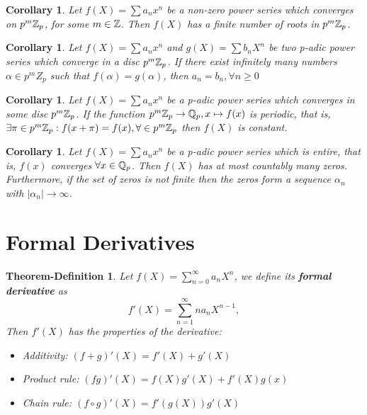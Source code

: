 \documentclass{article}
\theoremstyle{plain}
\newtheorem{Cor}[thm]{Corollary}
\newtheorem{thm-defi}[thm]{Theorem-Definition}
\theoremstyle{definition}
\begin{document}
	\begin{minipage}[t]{0.48\textwidth}
		\begin{Cor}
		Let $f(X) = \sum a_{n}x^{n}$ be a non-zero power series which converges on $p^{m}\Bbb Z_{p}$, for some $m \in \Bbb Z$. Then $f(X)$ has a finite number of roots in $p^{m} \Bbb Z_{p}$.
		\end{Cor}
		\begin{Cor}
		Let $f(X) = \sum a_{n}x^{n}$ and $g(X) = \sum b_{n}X^{n}$ be two p-adic power series which converge in a disc $p^{m}\Bbb Z_{p}$. If there exist infinitely many numbers $\alpha \in p^{m}Z_{p}$ such that $f(\alpha) = g(\alpha)$, then $a_{n} = b_{n}, \forall n \geq 0$
		\end{Cor}
		\begin{Cor}
		Let $f(X) = \sum a_{n}x^{n}$ be a p-adic power series which converges in some disc $p^{m}\Bbb Z_{p}$. If the function $p^{m}\Bbb Z_{p} \to \Bbb Q_{p}, x \mapsto f(x)$ is periodic, that is, $\exists \pi \in p^{m}\Bbb Z_{p} : f(x + \pi) = f(x), \forall \in p^{m}\Bbb Z_{p}$ then $f(X)$ is constant.
		\end{Cor}
		\begin{Cor}
		Let $f(X) = \sum a_{n}x^{n}$ be a p-adic power series which is entire, that is, $f(x)$ converges $\forall x \in \Bbb Q_{p}$. Then $f(X)$ has at most countably many zeros. Furthermore, if the set of zeros is not finite then the zeros form a sequence $\alpha_{n}$ with $|\alpha_{n}| \to \infty$.
		\end{Cor}
		\section{Formal Derivatives}
		\begin{thm-defi}
		Let $f(X) = \sum_{n=0}^{\infty} a_{n}X^{n} $, we define its \textbf{formal derivative} as
		$$f'(X) = \sum_{n=1}^{\infty} na_{n}X^{n-1}, $$
		Then $f'(X)$ has the properties of the derivative:
		\begin{itemize}
			\item Additivity: $(f+g)'(X) = f'(X) + g'(X)$
			\item Product rule: $(fg)'(X) = f(X)g'(X) + f'(X)g(x)$
			\item Chain rule: $(f \circ g)'(X) = f'(g(X))g'(X)$
		\end{itemize}
		\end{thm-defi}
	\end{minipage}
\end{document}
